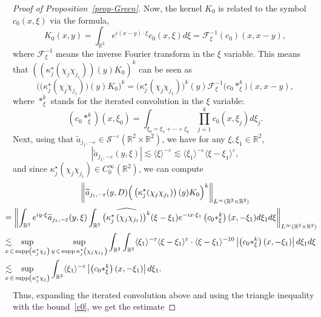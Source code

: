 \documentclass[10pt]{amsart}
\theoremstyle{definition}\newtheorem{defi}[theo]{Definition}\newtheorem{rema}[theo]{Remark}\newtheorem{exam}[theo]{Example}\newtheorem{exem}[theo]{Example}\newtheorem{nota}[theo]{Notation}
\newcommand{\R}{\mathbb{R}}
\DeclareMathOperator*{\supp}{supp}
\newcommand{\F}{\mathcal{F}}
\renewcommand{\S}{\mathcal{S}}
\newcommand{\eps}{\varepsilon}
\newcommand{\kk}{\kappa}
\newcommand{\wt}{\widetilde}
\newcommand{\les}{\lesssim}
\newcommand{\jb}[1] {\langle #1 \rangle}
\begin{document}
\begin{proof}[Proof of Proposition~\ref{prop-Green}]
Now, the kernel $K_0$ is related to the symbol $c_0(x,\xi)$ via the formula,
\begin{equation*}
K_0(x,y)=\int_{\R^2}e^{i(x-y)\cdot\xi}c_0(x,\xi)d\xi = \F_{\xi}^{-1}(c_0)(x,x-y),
\end{equation*}
where $\F_{\xi}^{-1}$ means the inverse Fourier transform in the $\xi$ variable. This means that 
$((\kk_j^\star(\chi_j\chi_{j_1}))(y)K_0)^k$ can be seen as
\begin{equation*}
\Big(\big(\kk_j^\star(\chi_j\chi_{j_1})\big)(y)K_0\Big)^k = \big(\kk_j^\star(\chi_j\chi_{j_1})\big)^k(y)\F_{\xi}^{-1}\big(c_0 *_{\xi}^k\big)(x,x-y),
\end{equation*}
where $*_{\xi}^k$ stands for the iterated convolution in the $\xi$ variable:
\begin{equation*}
\left(c_0*_{\xi}^k\right)(x,\xi_0) = \int_{\xi_0=\xi_1+\cdots+\xi_k}\prod_{j=1}^k c_0(x,\xi_j)d\xi_j.
\end{equation*}
Next, using that $\wt a_{j_1,-\eps}\in\S^{-\eps}(\R^2\times\R^2)$, we have for any $\xi,\xi_1\in\R^2$,
\begin{equation*}
\left|\wt a_{j_1,-\eps}(y,\xi)\right|\les \jb{\xi}^{-\eps}\les \jb{\xi_1}^{-\eps}\jb{\xi-\xi_1}^{\eps},
\end{equation*}
and since $\kk_j^\star(\chi_j\chi_{j_1})\in C^{\infty}_0(\R^2)$, we can compute
\begin{multline*}
\left\|\wt a_{j_1,-\eps}(y,D)\Big(\left(\kk_j^\star(\chi_j\chi_{j_1})\right)(y)K_0\Big)^k\right\|_{L^{\infty}(\R^2\times\R^2)}\\
\mkern-25mu\begin{aligned}
&= \left\|\int_{\R^2}e^{iy\cdot \xi}\wt a_{j_1,-\eps}(y,\xi)\int_{\R^2}\widehat{\left(\kk_j^\star\left(\chi_j\chi_{j_1}\right)\right)^k}(\xi-\xi_1) e^{-ix\cdot\xi_1}\left(c_0*_{\xi}^k\right)(x,-\xi_1)d\xi_1d\xi\right\|_{L^{\infty}(\R^2\times\R^2)}\\
&\les \mkern-20mu\sup_{x\,\in \,\supp\left(\kk_j^\star\chi_j\right)}\sup_{y\,\in\,\supp\kk_j^\star\left(\chi_j\chi_{j_1}\right)} \int_{\R^2}\int_{\R^2}\jb{\xi_1}^{-\eps}\jb{\xi-\xi_1}^{\eps}\cdot\jb{\xi-\xi_1}^{-10}\left|\left(c_0*_{\xi}^k\right)(x,-\xi_1)\right|d\xi_1d\xi\\
&\les \mkern-20mu\sup_{x\,\in\,\supp\left(\kk_j^\star\chi_j\right)} \int_{\R^2}\jb{\xi_1}^{-\eps}\left|\left(c_0*_{\xi}^k\right)(x,-\xi_1)\right|d\xi_1.
\end{aligned}
\end{multline*}
Thus, expanding the iterated convolution above and using the triangle inequality with the bound~\eqref{c0}, we get the estimate

\end{proof}
\end{document}
